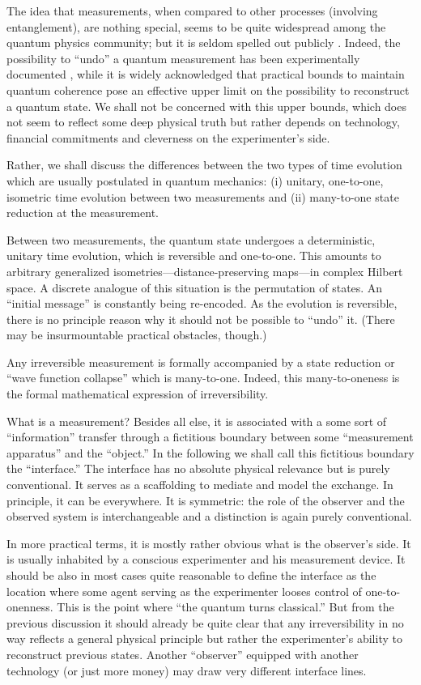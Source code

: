 The idea that measurements, when compared to other processes (involving
entanglement), are nothing special, seems to be quite widespread among
the quantum physics community; but it is seldom spelled out publicly
\cite{greenberger2,greenberger-talk-99}.
Indeed, the possibility to ``undo'' a quantum
measurement has been experimentally documented  \cite{hkwz},
while it is widely acknowledged that practical bounds to maintain
quantum coherence pose an effective upper limit on the possibility to
reconstruct a quantum state.
We shall not be concerned with this upper bounds, which does not seem to
reflect some deep physical truth but rather depends on
technology, financial commitments and cleverness on the experimenter's
side.


Rather, we shall discuss the differences between the two types of
time evolution which are usually postulated in quantum mechanics:
(i) unitary, one-to-one, isometric time
evolution between
two measurements and (ii) many-to-one state reduction at the measurement.

Between two measurements, the quantum state
undergoes a deterministic, unitary time evolution, which is reversible
and one-to-one. This amounts to arbitrary generalized
isometries---distance-preserving maps---in complex Hilbert space.
A discrete analogue of this situation is the permutation of
states.
An ``initial message'' is constantly being re-encoded.
As the evolution is reversible, there is no principle reason why
it should not be possible to ``undo'' it. (There may be insurmountable
practical obstacles, though.)

Any irreversible measurement is formally accompanied by a
state reduction or ``wave function collapse'' which is many-to-one.
Indeed, this many-to-oneness is the formal mathematical expression of irreversibility.

What is a measurement? Besides all else, it is associated with a
some sort of ``information''
transfer through a fictitious boundary between some ``measurement
apparatus'' and the ``object.''
In the following we shall call this fictitious boundary the ``interface.''
The interface has no absolute physical relevance but is purely
conventional.
It serves as a scaffolding to mediate and model the exchange.
In principle, it can be everywhere.
It is symmetric: the role of the
observer and the observed system is interchangeable and a
distinction is again purely conventional.


In more practical terms, it is mostly rather obvious what is the observer's
side. It is usually inhabited by a conscious experimenter and his
measurement device.
It should be also in most cases quite reasonable to define the
interface as the location where some agent serving as the experimenter
looses
control of one-to-onenness. This is the point where ``the quantum turns
classical.''
But from the previous discussion it should already be quite
clear that any irreversibility in no way reflects a general
physical principle but rather the experimenter's ability to reconstruct
previous states.
Another ``observer'' equipped with another technology (or just more
money) may draw very different interface lines.

